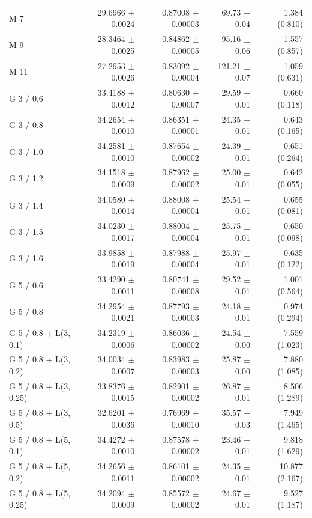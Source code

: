 \begin{longtable}{lrrrr}
M 7 & 29.6966 $\pm$ 0.0024 & 0.87008 $\pm$ 0.00003 & 69.73 $\pm$ 0.04 & 1.384 (0.810) \\
M 9 & 28.3464 $\pm$ 0.0025 & 0.84862 $\pm$ 0.00005 & 95.16 $\pm$ 0.06 & 1.557 (0.857) \\
M 11 & 27.2953 $\pm$ 0.0026 & 0.83092 $\pm$ 0.00004 & 121.21 $\pm$ 0.07 & 1.059 (0.631) \\
G 3 / 0.6 & 33.4188 $\pm$ 0.0012 & 0.80630 $\pm$ 0.00007 & 29.59 $\pm$ 0.01 & 0.660 (0.118) \\
G 3 / 0.8 & 34.2654 $\pm$ 0.0010 & 0.86351 $\pm$ 0.00001 & 24.35 $\pm$ 0.01 & 0.643 (0.165) \\
G 3 / 1.0 & 34.2581 $\pm$ 0.0010 & 0.87654 $\pm$ 0.00002 & 24.39 $\pm$ 0.01 & 0.651 (0.264) \\
G 3 / 1.2 & 34.1518 $\pm$ 0.0009 & 0.87962 $\pm$ 0.00002 & 25.00 $\pm$ 0.01 & 0.642 (0.055) \\
G 3 / 1.4 & 34.0580 $\pm$ 0.0014 & 0.88008 $\pm$ 0.00004 & 25.54 $\pm$ 0.01 & 0.655 (0.081) \\
G 3 / 1.5 & 34.0230 $\pm$ 0.0017 & 0.88004 $\pm$ 0.00004 & 25.75 $\pm$ 0.01 & 0.650 (0.098) \\
G 3 / 1.6 & 33.9858 $\pm$ 0.0019 & 0.87988 $\pm$ 0.00004 & 25.97 $\pm$ 0.01 & 0.635 (0.122) \\
G 5 / 0.6 & 33.4290 $\pm$ 0.0011 & 0.80741 $\pm$ 0.00008 & 29.52 $\pm$ 0.01 & 1.001 (0.564) \\
G 5 / 0.8 & 34.2954 $\pm$ 0.0021 & 0.87793 $\pm$ 0.00003 & 24.18 $\pm$ 0.01 & 0.974 (0.294) \\
G 5 / 0.8 + L(3, 0.1) & 34.2319 $\pm$ 0.0006 & 0.86036 $\pm$ 0.00002 & 24.54 $\pm$ 0.00 & 7.559 (1.023) \\
G 5 / 0.8 + L(3, 0.2) & 34.0034 $\pm$ 0.0007 & 0.83983 $\pm$ 0.00003 & 25.87 $\pm$ 0.00 & 7.880 (1.085) \\
G 5 / 0.8 + L(3, 0.25) & 33.8376 $\pm$ 0.0015 & 0.82901 $\pm$ 0.00002 & 26.87 $\pm$ 0.01 & 8.506 (1.289) \\
G 5 / 0.8 + L(3, 0.5) & 32.6201 $\pm$ 0.0036 & 0.76969 $\pm$ 0.00010 & 35.57 $\pm$ 0.03 & 7.949 (1.465) \\
G 5 / 0.8 + L(5, 0.1) & 34.4272 $\pm$ 0.0010 & 0.87578 $\pm$ 0.00002 & 23.46 $\pm$ 0.01 & 9.818 (1.629) \\
G 5 / 0.8 + L(5, 0.2) & 34.2656 $\pm$ 0.0011 & 0.86101 $\pm$ 0.00002 & 24.35 $\pm$ 0.01 & 10.877 (2.167) \\
G 5 / 0.8 + L(5, 0.25) & 34.2094 $\pm$ 0.0009 & 0.85572 $\pm$ 0.00002 & 24.67 $\pm$ 0.01 & 9.527 (1.187) \\

\end{longtable}
